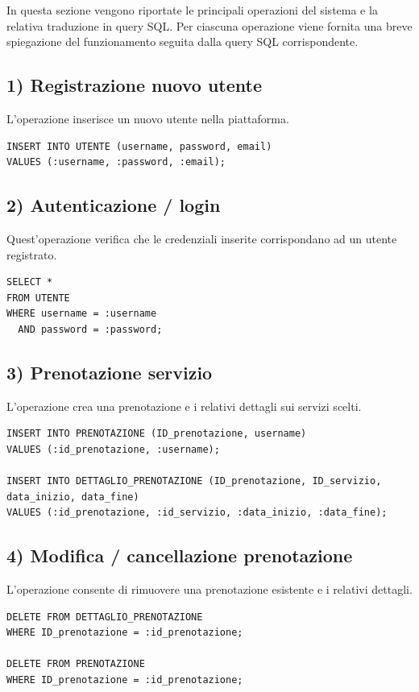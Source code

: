 \documentclass[a4paper,12pt]{report}
\begin{document}
In questa sezione vengono riportate le principali operazioni del sistema
e la relativa traduzione in query SQL.  
Per ciascuna operazione viene fornita una breve spiegazione del funzionamento seguita dalla query SQL corrispondente.

\subsection*{1) Registrazione nuovo utente}
L’operazione inserisce un nuovo utente nella piattaforma.
\begin{verbatim}
INSERT INTO UTENTE (username, password, email)
VALUES (:username, :password, :email);
\end{verbatim}

\subsection*{2) Autenticazione / login}
Quest'operazione verifica che le credenziali inserite corrispondano ad un utente registrato.
\begin{verbatim}
SELECT *
FROM UTENTE
WHERE username = :username
  AND password = :password;
\end{verbatim}

\subsection*{3) Prenotazione servizio}
L'operazione crea una prenotazione e i relativi dettagli sui servizi scelti.
\begin{verbatim}
INSERT INTO PRENOTAZIONE (ID_prenotazione, username)
VALUES (:id_prenotazione, :username);

INSERT INTO DETTAGLIO_PRENOTAZIONE (ID_prenotazione, ID_servizio, data_inizio, data_fine)
VALUES (:id_prenotazione, :id_servizio, :data_inizio, :data_fine);
\end{verbatim}

\subsection*{4) Modifica / cancellazione prenotazione}
L'operazione consente di rimuovere una prenotazione esistente e i relativi dettagli.
\begin{verbatim}
DELETE FROM DETTAGLIO_PRENOTAZIONE
WHERE ID_prenotazione = :id_prenotazione;

DELETE FROM PRENOTAZIONE
WHERE ID_prenotazione = :id_prenotazione;
\end{verbatim}
\end{document}
